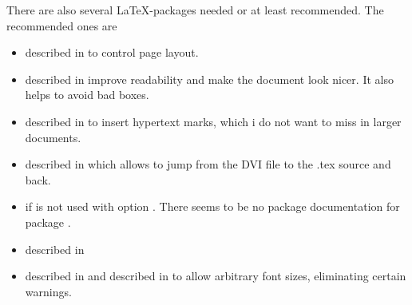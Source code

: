 \documentclass[12pt]{book}
\newif\iflatextortf %
\begin{document}
There are also several \LaTeX-packages needed or at least recommended. 
The recommended ones are 
%
\begin{itemize}
\item
{} described in \cite{GeomP} 
to control page layout. 
\item
{} described in \cite{MicroTyP} improve readability 
and make the document look nicer. 
It also helps to avoid bad boxes. 
\item
{} described in \cite{HyperTextP} 
to insert hypertext marks, which i do not want to miss in larger documents. 
\item
{} described in \cite{SrcLtxP} 
which allows to jump from the DVI file to the .tex source and back. 
\item
{} 
if  is not used with option . 
There seems to be no package documentation for package . 
\item
{} described in \cite{BooktP} 

\item
{} described in \cite{FixCmP} and 
 described in \cite{AnyfontsizeP} 
to allow arbitrary font sizes, eliminating certain warnings. 
\end{itemize}
\end{document}
